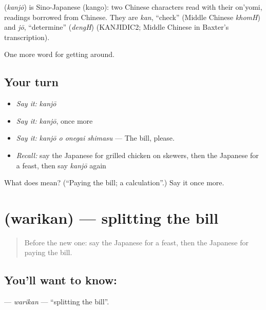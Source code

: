 \begin{cousinweb}
\textbf{} (\emph{kanjō}) is Sino-Japanese (kango): two Chinese characters read with their on'yomi, readings borrowed from Chinese. They are \emph{kan}, \textquotedblleft{}check\textquotedblright{} (Middle Chinese \emph{khomH}) and \emph{jō}, \textquotedblleft{}determine\textquotedblright{} (\emph{dengH}) (KANJIDIC2; Middle Chinese in Baxter's transcription).
\end{cousinweb}

\begin{grammarlens}[title={What you've built}]
One more word for getting around.
\end{grammarlens}

\subsection*{Your turn}
\begin{itemize}
\raggedright
  \item \emph{Say it:} \emph{kanjō}
  \item \emph{Say it:} \emph{kanjō}, once more
  \item \emph{Say it:} \emph{kanjō o onegai shimasu} — The bill, please.
  \item \emph{Recall:} say the Japanese for grilled chicken on skewers, then the Japanese for a feast, then say \emph{kanjō} again
\end{itemize}

\begin{tcolorbox}[breakable,colback=teal!4,colframe=teal!35!black,title={Before you move on}]
What does  mean? (\textquotedblleft{}Paying the bill; a calculation\textquotedblright{}.) Say it once more.
\end{tcolorbox}
\section[\texorpdfstring{\ja{わりかん} (warikan)}{わりかん (warikan)}]{ (warikan) — splitting the bill}

\label{lesson:JA-C423-warikan}



\begin{quote}
Before the new one: say the Japanese for a feast, then the Japanese for paying the bill.
\end{quote}

\subsection*{You'll want to know: }
\textbf{} — \emph{warikan} — \textquotedblleft{}splitting the bill\textquotedblright{}.

